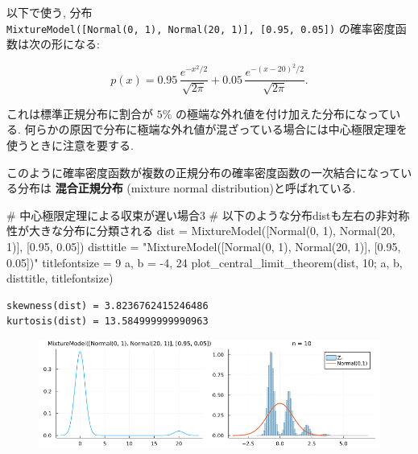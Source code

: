 \documentclass[
  letterpaper,
  DIV=11,
  numbers=noendperiod]{scrartcl}
\newenvironment{Shaded}{\begin{snugshade}}{\end{snugshade}}
\newcommand{\CommentTok}[1]{\textcolor[rgb]{0.37,0.37,0.37}{#1}}
\newcommand{\FloatTok}[1]{\textcolor[rgb]{0.68,0.00,0.00}{#1}}
\newcommand{\FunctionTok}[1]{\textcolor[rgb]{0.28,0.35,0.67}{#1}}
\newcommand{\NormalTok}[1]{\textcolor[rgb]{0.00,0.23,0.31}{#1}}
\newcommand{\OperatorTok}[1]{\textcolor[rgb]{0.37,0.37,0.37}{#1}}
\newcommand{\StringTok}[1]{\textcolor[rgb]{0.13,0.47,0.30}{#1}}
\begin{document}
以下で使う, 分布
\texttt{MixtureModel({[}Normal(0,\ 1),\ Normal(20,\ 1){]},\ {[}0.95,\ 0.05{]})}
の確率密度函数は次の形になる:

\[
p(x) = 0.95\,\frac{e^{-x^2/2}}{\sqrt{2\pi}} + 0.05\,\frac{e^{-(x-20)^2/2}}{\sqrt{2\pi}}.
\]

これは標準正規分布に割合が \(5\%\)
の極端な外れ値を付け加えた分布になっている.
何らかの原因で分布に極端な外れ値が混ざっている場合には中心極限定理を使うときに注意を要する.

このように確率密度函数が複数の正規分布の確率密度函数の一次結合になっている分布は
\textbf{混合正規分布} (mixture normal distribution)と呼ばれている.

\begin{Shaded}
\begin{Highlighting}[]
\CommentTok{\# 中心極限定理による収束が遅い場合3}
\CommentTok{\# 以下のような分布distも左右の非対称性が大きな分布に分類される}
\NormalTok{dist }\OperatorTok{=} \FunctionTok{MixtureModel}\NormalTok{([}\FunctionTok{Normal}\NormalTok{(}\FloatTok{0}\NormalTok{, }\FloatTok{1}\NormalTok{), }\FunctionTok{Normal}\NormalTok{(}\FloatTok{20}\NormalTok{, }\FloatTok{1}\NormalTok{)], [}\FloatTok{0.95}\NormalTok{, }\FloatTok{0.05}\NormalTok{])}
\NormalTok{disttitle }\OperatorTok{=} \StringTok{"MixtureModel([Normal(0, 1), Normal(20, 1)], [0.95, 0.05])"}
\NormalTok{titlefontsize }\OperatorTok{=} \FloatTok{9}
\NormalTok{a, b }\OperatorTok{=} \OperatorTok{{-}}\FloatTok{4}\NormalTok{, }\FloatTok{24}
\FunctionTok{plot\_central\_limit\_theorem}\NormalTok{(dist, }\FloatTok{10}\NormalTok{; a, b, disttitle, titlefontsize)}
\end{Highlighting}
\end{Shaded}

\begin{verbatim}
skewness(dist) = 3.8236762415246486
kurtosis(dist) = 13.584999999990963
\end{verbatim}

\begin{figure}[H]

{\centering \includegraphics{05 Central limit theorem_files/figure-pdf/cell-87-output-2.png}

}

\end{figure}
\end{document}
